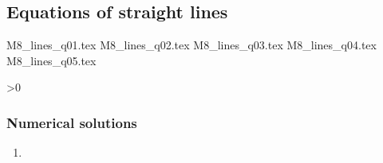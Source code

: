 \subsection{Equations of straight lines}

\begin{questions}

{M8_lines_q01.tex}
{M8_lines_q02.tex}
{M8_lines_q03.tex}
{M8_lines_q04.tex}
{M8_lines_q05.tex}

\ifnum\value{printSols}>0
	\subsubsection*{Numerical solutions}
	\setcounter{solNo}{2}
	\begin{enumerate}
		\item \printSolutionAndInc{} %
	\end{enumerate}
	\else
\fi

\end{questions}